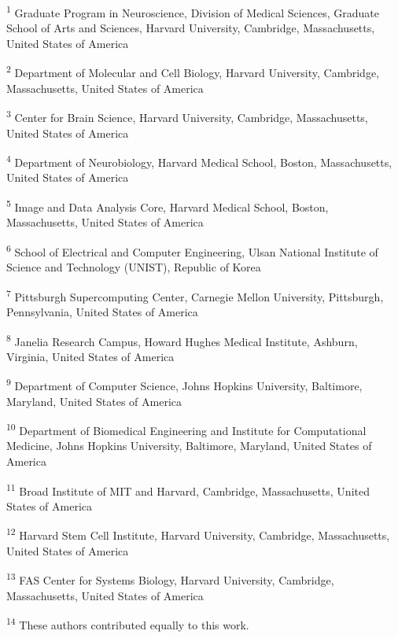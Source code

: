 \documentclass{article}
\begin{document}
\begin{hangpars}\small
\textsuperscript{1} Graduate Program in Neuroscience, Division of Medical Sciences, Graduate School of Arts and Sciences, Harvard University, Cambridge, Massachusetts, United States of America

\textsuperscript{2} Department of Molecular and Cell Biology, Harvard University, Cambridge, Massachusetts, United States of America

\textsuperscript{3} Center for Brain Science, Harvard University, Cambridge, Massachusetts, United States of America

\textsuperscript{4} Department of Neurobiology, Harvard Medical School, Boston, Massachusetts, United States of America

\textsuperscript{5} Image and Data Analysis Core, Harvard Medical School, Boston, Massachusetts, United States of America

\textsuperscript{6} School of Electrical and Computer Engineering, Ulsan National Institute of Science and Technology (UNIST), Republic of Korea

\textsuperscript{7} Pittsburgh Supercomputing Center, Carnegie Mellon University, Pittsburgh, Pennsylvania, United States of America

\textsuperscript{8} Janelia Research Campus, Howard Hughes Medical Institute, Ashburn, Virginia, United States of America

\textsuperscript{9} Department of Computer Science, Johns Hopkins University, Baltimore, Maryland, United States of America

\textsuperscript{10} Department of Biomedical Engineering and Institute for Computational Medicine, Johns Hopkins University, Baltimore, Maryland, United States of America

\textsuperscript{11} Broad Institute of MIT and Harvard, Cambridge, Massachusetts, United States of America

\textsuperscript{12} Harvard Stem Cell Institute, Harvard University, Cambridge, Massachusetts, United States of America

\textsuperscript{13} FAS Center for Systems Biology, Harvard University, Cambridge, Massachusetts, United States of America

\textsuperscript{14} These authors contributed equally to this work.
\end{hangpars}
\end{document}
